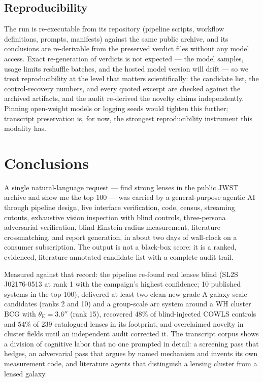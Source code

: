 \documentclass[11pt,letterpaper]{article}
\newcommand{\thetaE}{\ensuremath{\theta_{\mathrm{E}}}}
\begin{document}
\subsection{Reproducibility}\label{sec:repro}

The run is re-executable from its repository (pipeline scripts, workflow
definitions, prompts, manifests) against the same public archive, and its
conclusions are re-derivable from the preserved verdict files without any
model access. Exact re-generation of verdicts is not expected --- the model
samples, usage limits reshuffle batches, and the hosted model version will
drift --- so we treat reproducibility at the level that matters
scientifically: the candidate list, the control-recovery numbers, and every
quoted excerpt are checked against the archived artifacts, and the audit
re-derived the novelty claims independently. Pinning open-weight models or
logging seeds would tighten this further; transcript preservation is, for
now, the strongest reproducibility instrument this modality has.

\section{Conclusions}\label{sec:conclusions}

A single natural-language request --- find strong lenses in the public JWST
archive and show me the top 100 --- was carried by a general-purpose agentic
AI through pipeline design, live interface verification, code, census,
streaming cutouts, exhaustive vision inspection with blind controls,
three-persona adversarial verification, blind Einstein-radius measurement,
literature crossmatching, and report generation, in about two days of
wall-clock on a consumer subscription. The output is not a black-box score:
it is a ranked, evidenced, literature-annotated candidate list with a
complete audit trail.

Measured against that record: the pipeline re-found real lenses blind (SL2S
J02176-0513 at rank 1 with the campaign's highest confidence; 10 published
systems in the top 100), delivered at least two clean new grade-A
galaxy-scale candidates (ranks 2 and 10) and a group-scale arc system around
a WH cluster BCG with $\thetaE=3.6''$ (rank 15), recovered 48\% of
blind-injected COWLS controls and 54\% of 239 catalogued lenses in its
footprint, and overclaimed novelty in cluster fields until an independent
audit corrected it. The transcript corpus shows a division of cognitive labor
that no one prompted in detail: a screening pass that hedges, an adversarial
pass that argues by named mechanism and invents its own measurement code, and
literature agents that distinguish a lensing cluster from a lensed galaxy.
\end{document}
